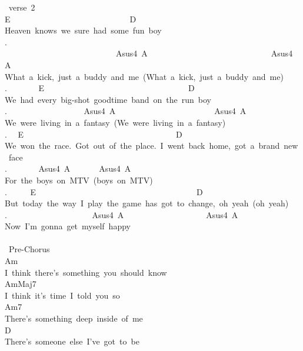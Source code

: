 {\lbrack\ verse\ 2\rbrack\\
E\ \ \ \ \ \ \ \ \ \ \ \ \ \ \ \ \ \ \ \ \ \ \ \ \ \ \ \ \ D\\
Heaven\ knows\ we\ sure\ had\ some\ fun\ boy\\
. \ \ \ \ \ \ \ \ \ \ \ \ \ \ \ \ \ \ \ \ \ \ \ \ \ \ \ Asus4\ A\ \ \ \ \ \ \ \ \ \ \ \ \ \ \ \ \ \ \ \ \ \ \ \ \ \ \ \ \ \ Asus4\ A\\
What\ a\ kick,\ just\ a\ buddy\ and\ me\ (What\ a\ kick,\ just\ a\ buddy\ and\ me)\\
. \ \ \ \ \ \ \ E\ \ \ \ \ \ \ \ \ \ \ \ \ \ \ \ \ \ \ \ \ \ \ \ \ \ \ \ \ \ \ \ \ \ \ D\ \ \ \ \\
We\ had\ every\ big-shot\ goodtime\ band\ on\ the\ run\ boy\\
. \ \ \ \ \ \ \ \ \ \ \ \ \ \ \ \ \ \ Asus4\ A\ \ \ \ \ \ \ \ \ \ \ \ \ \ \ \ \ \ \ \ \ \ \ \ Asus4\ A\ \ \\
We\ were\ living\ in\ a\ fantasy\ (We\ were\ living\ in\ a\ fantasy)\\
. \ \ E\ \ \ \ \ \ \ \ \ \ \ \ \ \ \ \ \ \ \ \ \ \ \ \ \ \ \ \ \ \ \ \ \ \ \ \ \ D\\
We\ won\ the\ race.\ Got\ out\ of\ the\ place.\ I\ went\ back\ home,\ got\ a\ brand\ new\ face\\
. \ \ \ \ \ \ \ Asus4\ A\ \ \ \ \ \ \ Asus4\ A\\
For\ the\ boys\ on\ MTV\ (boys\ on\ MTV)\\
. \ \ \ \ \ E\ \ \ \ \ \ \ \ \ \ \ \ \ \ \ \ \ \ \ \ \ \ \ \ \ \ \ \ \ \ \ \ \ \ \ \ \ \ \ D\\
But\ today\ the\ way\ I\ play\ the\ game\ has\ got\ to\ change,\ oh\ yeah\ (oh\ yeah)\\
. \ \ \ \ \ \ \ \ \ \ \ \ \ \ \ \ \ \ \ \ Asus4\ A\ \ \ \ \ \ \ \ \ \ \ \ \ \ \ \ \ \ \ \ Asus4\ A\\
Now\ I'm\ gonna\ get\ myself\ happy\\
\\
\lbrack\ Pre-Chorus\rbrack\\
Am\ \\
I\ think\ there's\ something\ you\ should\ know\\
AmMaj7\\
I\ think\ it's\ time\ I\ told\ you\ so\\
Am7\\
There's\ something\ deep\ inside\ of\ me\\
D\\
There's\ someone\ else\ I've\ got\ to\ be\\
}

